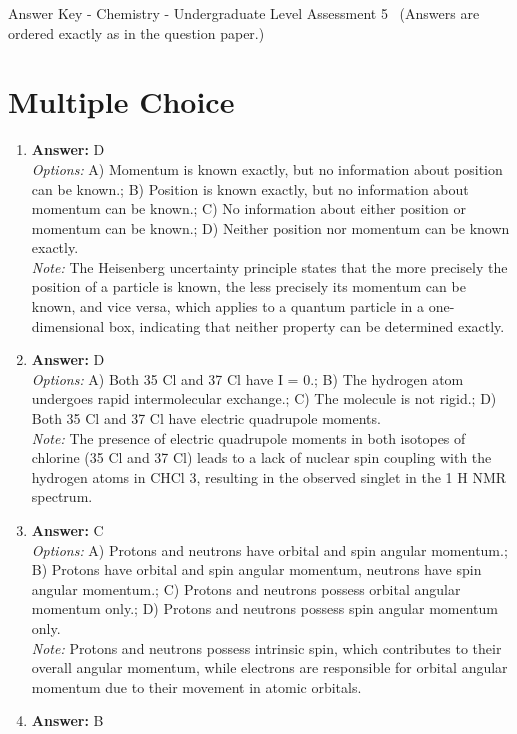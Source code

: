 \documentclass[12pt]{article}
\begin{document}
\begin{center}
Answer Key - Chemistry - Undergraduate Level Assessment 5 \
\small (Answers are ordered exactly as in the question paper.)
\end{center}

\section*{Multiple Choice}
\begin{enumerate}[label=\arabic*.]
\item \textbf{Answer:} D
\\ \textit{Options:} A) Momentum is known exactly, but no information about position can be known.; B) Position is known exactly, but no information about momentum can be known.; C) No information about either position or momentum can be known.; D) Neither position nor momentum can be known exactly.
\\ \textit{Note:} The Heisenberg uncertainty principle states that the more precisely the position of a particle is known, the less precisely its momentum can be known, and vice versa, which applies to a quantum particle in a one-dimensional box, indicating that neither property can be determined exactly.
\item \textbf{Answer:} D
\\ \textit{Options:} A) Both 35 Cl and 37 Cl have I = 0.; B) The hydrogen atom undergoes rapid intermolecular exchange.; C) The molecule is not rigid.; D) Both 35 Cl and 37 Cl have electric quadrupole moments.
\\ \textit{Note:} The presence of electric quadrupole moments in both isotopes of chlorine (35 Cl and 37 Cl) leads to a lack of nuclear spin coupling with the hydrogen atoms in CHCl 3, resulting in the observed singlet in the 1 H NMR spectrum.
\item \textbf{Answer:} C
\\ \textit{Options:} A) Protons and neutrons have orbital and spin angular momentum.; B) Protons have orbital and spin angular momentum, neutrons have spin angular momentum.; C) Protons and neutrons possess orbital angular momentum only.; D) Protons and neutrons possess spin angular momentum only.
\\ \textit{Note:} Protons and neutrons possess intrinsic spin, which contributes to their overall angular momentum, while electrons are responsible for orbital angular momentum due to their movement in atomic orbitals.
\item \textbf{Answer:} B

\end{enumerate}
\end{document}
